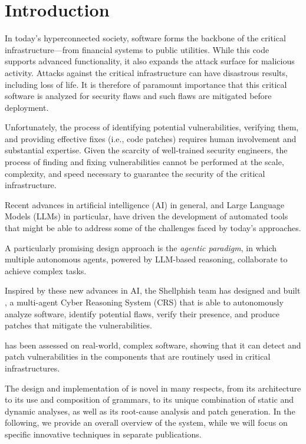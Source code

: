 \section{Introduction}
\label{introduction}

In today’s hyperconnected society, software forms the backbone of the critical infrastructure—from financial systems to public utilities. 
While this code supports advanced functionality, it also expands the attack surface for malicious activity.
Attacks against the critical infrastructure can have disastrous results, including loss of life.
It is therefore of paramount importance that this critical software is analyzed for security flaws and such flaws are mitigated before deployment.

Unfortunately, the process of identifying potential vulnerabilities, verifying them, and providing effective fixes (i.e., code patches) requires human involvement and substantial expertise.
Given the scarcity of well-trained security engineers, the process of finding and fixing vulnerabilities cannot be performed at the scale, complexity, and speed necessary to guarantee the security of the critical infrastructure.

Recent advances in artificial intelligence (AI) in general, and Large Language Models (LLMs) in particular, have driven the development of automated tools that might be able to address some of the challenges faced by today's approaches. 

A particularly promising design approach is the \emph{agentic paradigm}, in which multiple autonomous agents, powered by LLM-based reasoning, collaborate to achieve complex tasks.

Inspired by these new advances in AI, the Shellphish team has designed and built \artiphishell, a multi-agent Cyber Reasoning System (CRS) that is able to autonomously analyze software, identify potential flaws, verify their presence, and produce patches that mitigate the vulnerabilities.

\artiphishell has been assessed on real-world, complex software, showing that it can detect and patch vulnerabilities in the components that are routinely used in critical infrastructures.

The design and implementation of \artiphishell is novel in many respects, from its architecture to its use and composition of grammars, to its unique combination of static and dynamic analyses, as well as its root-cause analysis and patch generation.
In the following, we provide an overall overview of the system, while we will focus on specific innovative techniques in separate publications. 